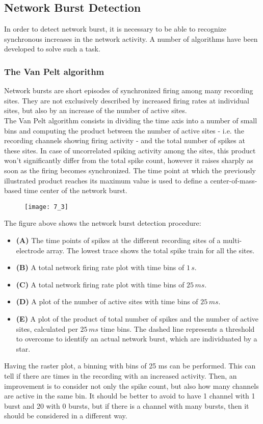 \subsection{Network Burst Detection}
In order to detect network burst, it is necessary to be able to recognize synchronous
increases in the network activity. A number of algorithms have been developed to
solve such a task.
\subsubsection{The Van Pelt algorithm}
Network bursts are short episodes of synchronized firing among many recording sites. They are not
exclusively described by increased firing rates at individual sites, but also by an
increase of the number of active sites.\\ 
The Van Pelt algorithm consists in dividing the time
axis into a number of small bins and computing the product between the number of
active sites - i.e. the recording channels showing firing activity - and the total
number of spikes at these sites. In case of uncorrelated spiking activity among
the sites, this product won't significantly differ from the total spike count, however
it raises sharply as soon as the firing becomes synchronized. The time point at
which the previously illustrated product reaches its maximum value is used to
define a center-of-mass-based time center of the network burst.
\begin{figure}[H]
    \texttt{[image: 7\_3]}
    \centering
\end{figure}
The figure above shows the network burst detection procedure:
\begin{itemize}
    \item \textbf{(A)} The time points of spikes at the different recording sites of
          a multi-electrode array. The lowest trace shows the total spike train for all
          the sites.
    \item \textbf{(B)} A total network firing rate plot with time bins of \(1\,s\).
    \item \textbf{(C)} A total network firing rate plot with time bins of \(25\,ms\).
    \item \textbf{(D)} A plot of the number of active sites with time bins
          of \(25\,ms\).
    \item \textbf{(E)} A plot of the product of total number of spikes and the
          number of active sites, calculated per \(25\,ms\) time bins. The dashed line
          represents a threshold to overcome to identify an actual network burst, which
          are individuated by a star.
\end{itemize}
Having the raster plot, a binning with bins of 25 ms can be performed. This can tell if there are times in the recording with an increased activity. Then, an improvement is to consider not only the spike count, but also how many channels are active in the same bin. It should be better to avoid to have 1 channel with 1 burst and 20 with 0 bursts, but if there is a channel with many bursts, then it should be considered in a different way.
